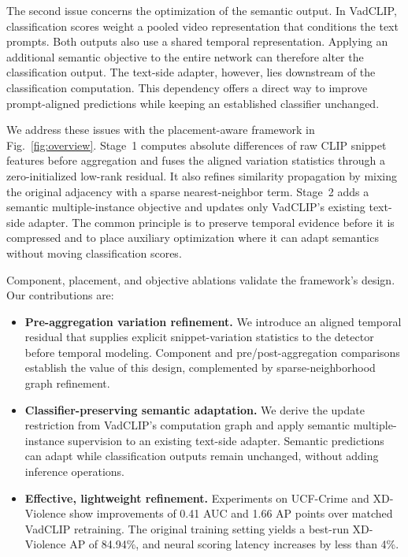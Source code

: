 The second issue concerns the optimization of the semantic output. In VadCLIP, classification scores weight a pooled video representation that conditions the text prompts. Both outputs also use a shared temporal representation. Applying an additional semantic objective to the entire network can therefore alter the classification output. The text-side adapter, however, lies downstream of the classification computation. This dependency offers a direct way to improve prompt-aligned predictions while keeping an established classifier unchanged.

We address these issues with the placement-aware framework in Fig.~\ref{fig:overview}. Stage~1 computes absolute differences of raw CLIP snippet features before aggregation and fuses the aligned variation statistics through a zero-initialized low-rank residual. It also refines similarity propagation by mixing the original adjacency with a sparse nearest-neighbor term. Stage~2 adds a semantic multiple-instance objective and updates only VadCLIP's existing text-side adapter. The common principle is to preserve temporal evidence before it is compressed and to place auxiliary optimization where it can adapt semantics without moving classification scores.

Component, placement, and objective ablations validate the framework's design. Our contributions are:
\begin{itemize}
\item \textbf{Pre-aggregation variation refinement.} We introduce an aligned temporal residual that supplies explicit snippet-variation statistics to the detector before temporal modeling. Component and pre/post-aggregation comparisons establish the value of this design, complemented by sparse-neighborhood graph refinement.
\item \textbf{Classifier-preserving semantic adaptation.} We derive the update restriction from VadCLIP's computation graph and apply semantic multiple-instance supervision to an existing text-side adapter. Semantic predictions can adapt while classification outputs remain unchanged, without adding inference operations.
\item \textbf{Effective, lightweight refinement.} Experiments on UCF-Crime and XD-Violence show improvements of 0.41 AUC and 1.66 AP points over matched VadCLIP retraining. The original training setting yields a best-run XD-Violence AP of 84.94\%, and neural scoring latency increases by less than 4\%.
\end{itemize}
